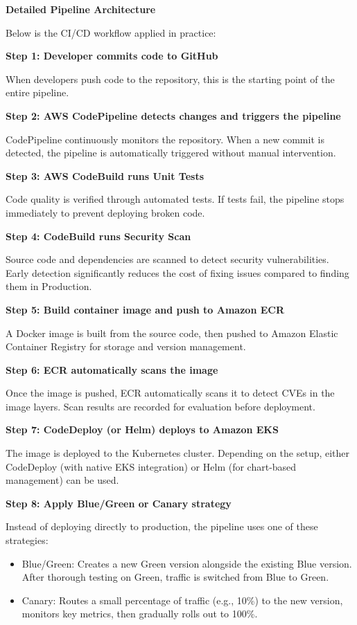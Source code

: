 \vspace{0.5em}\noindent\textbf{Detailed Pipeline
Architecture}\par

Below is the CI/CD workflow applied in practice:

\textbf{Step 1: Developer commits code to GitHub}

When developers push code to the repository, this is the starting point
of the entire pipeline.

\textbf{Step 2: AWS CodePipeline detects changes and triggers the
pipeline}

CodePipeline continuously monitors the repository. When a new commit is
detected, the pipeline is automatically triggered without manual
intervention.

\textbf{Step 3: AWS CodeBuild runs Unit Tests}

Code quality is verified through automated tests. If tests fail, the
pipeline stops immediately to prevent deploying broken code.

\textbf{Step 4: CodeBuild runs Security Scan}

Source code and dependencies are scanned to detect security
vulnerabilities. Early detection significantly reduces the cost of
fixing issues compared to finding them in Production.

\textbf{Step 5: Build container image and push to Amazon ECR}

A Docker image is built from the source code, then pushed to Amazon
Elastic Container Registry for storage and version management.

\textbf{Step 6: ECR automatically scans the image}

Once the image is pushed, ECR automatically scans it to detect CVEs in
the image layers. Scan results are recorded for evaluation before
deployment.

\textbf{Step 7: CodeDeploy (or Helm) deploys to Amazon EKS}

The image is deployed to the Kubernetes cluster. Depending on the setup,
either CodeDeploy (with native EKS integration) or Helm (for chart-based
management) can be used.

\textbf{Step 8: Apply Blue/Green or Canary strategy}

Instead of deploying directly to production, the pipeline uses one of
these strategies:

\begin{itemize}
\tightlist
\item
  Blue/Green: Creates a new Green version alongside the existing Blue
  version. After thorough testing on Green, traffic is switched from
  Blue to Green.
\item
  Canary: Routes a small percentage of traffic (e.g., 10\%) to the new
  version, monitors key metrics, then gradually rolls out to 100\%.
\end{itemize}

